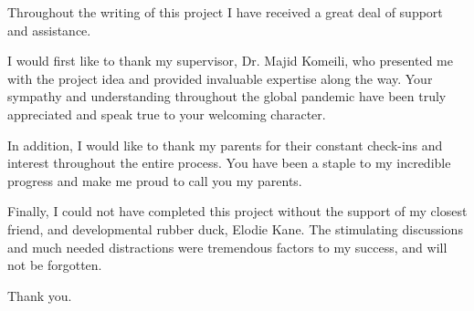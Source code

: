 Throughout the writing of this project I have received a great deal of support and assistance.

\hfill

I would first like to thank my supervisor, Dr. Majid Komeili, who presented me with the project idea and provided invaluable expertise along the way. Your sympathy and understanding throughout the global pandemic have been truly appreciated and speak true to your welcoming character.

\hfill

In addition, I would like to thank my parents for their constant check-ins and interest throughout the entire process. You have been a staple to my incredible progress and make me proud to call you my parents.

\hfill

Finally, I could not have completed this project without the support of my closest friend, and developmental rubber duck, Elodie Kane. The stimulating discussions and much needed distractions were tremendous factors to my success, and will not be forgotten.

\vspace{3.0cm}

\noindent Thank you.